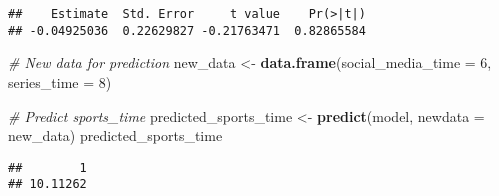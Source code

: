 \documentclass[
]{article}
\newenvironment{Shaded}{\begin{snugshade}}{\end{snugshade}}
\newcommand{\AttributeTok}[1]{\textcolor[rgb]{0.13,0.29,0.53}{#1}}
\newcommand{\CommentTok}[1]{\textcolor[rgb]{0.56,0.35,0.01}{\textit{#1}}}
\newcommand{\DecValTok}[1]{\textcolor[rgb]{0.00,0.00,0.81}{#1}}
\newcommand{\FunctionTok}[1]{\textcolor[rgb]{0.13,0.29,0.53}{\textbf{#1}}}
\newcommand{\NormalTok}[1]{#1}
\newcommand{\OtherTok}[1]{\textcolor[rgb]{0.56,0.35,0.01}{#1}}
\begin{document}
\begin{verbatim}
##    Estimate  Std. Error     t value    Pr(>|t|) 
## -0.04925036  0.22629827 -0.21763471  0.82865584
\end{verbatim}

\begin{Shaded}
\begin{Highlighting}[]
\CommentTok{\# New data for prediction}
\NormalTok{new\_data }\OtherTok{\textless{}{-}} \FunctionTok{data.frame}\NormalTok{(}\AttributeTok{social\_media\_time =} \DecValTok{6}\NormalTok{, }\AttributeTok{series\_time =} \DecValTok{8}\NormalTok{)}

\CommentTok{\# Predict sports\_time}
\NormalTok{predicted\_sports\_time }\OtherTok{\textless{}{-}} \FunctionTok{predict}\NormalTok{(model, }\AttributeTok{newdata =}\NormalTok{ new\_data)}
\NormalTok{predicted\_sports\_time}
\end{Highlighting}
\end{Shaded}

\begin{verbatim}
##        1 
## 10.11262
\end{verbatim}
\end{document}
